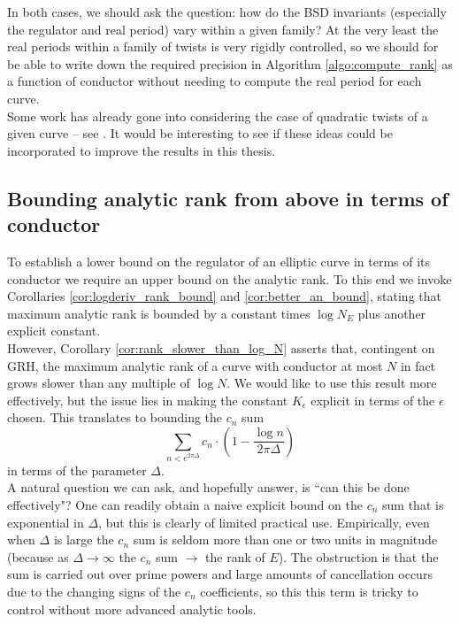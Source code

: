 In both cases, we should ask the question: how do the BSD invariants (especially the regulator and real period) vary within a given family? At the very least the real periods within a family of twists is very rigidly controlled, so we should for be able to write down the required precision in Algorithm \ref{algo:compute_rank} as a function of conductor without needing to compute the real period for each curve. \\

Some work has already gone into considering the case of quadratic twists of a given curve -- see \cite{DeRo-2007}. It would be interesting to see if these ideas could be incorporated to improve the results in this thesis.

\subsection{Bounding analytic rank from above in terms of conductor}

To establish a lower bound on the regulator of an elliptic curve in terms of its conductor we require an upper bound on the analytic rank. To this end we invoke Corollaries \ref{cor:logderiv_rank_bound} and \ref{cor:better_an_bound}, stating that maximum analytic rank is bounded by a constant times $\log N_E$ plus another explicit constant. \\

However, Corollary \ref{cor:rank_slower_than_log_N} asserts that, contingent on GRH, the maximum analytic rank of a curve with conductor at most $N$ in fact grows slower than any multiple of $\log N$. We would like to use this result more effectively, but the issue lies in making the constant $K_\epsilon$ explicit in terms of the $\epsilon$ chosen. This translates to bounding the $c_n$ sum
\begin{equation}
\sum_{n < e^{2\pi \Delta}} c_n \cdot \left(1-\frac{\log n}{2\pi \Delta}\right)
\end{equation}
in terms of the parameter $\Delta$. \\

A natural question we can ask, and hopefully answer, is ``can this be done effectively"? One can readily obtain a naive explicit bound on the $c_n$ sum that is exponential in $\Delta$, but this is clearly of limited practical use. Empirically, even when $\Delta$ is large the $c_n$ sum is seldom more than one or two units in magnitude (because as $\Delta \to \infty$ the $c_n$ sum $\to$ the rank of $E$). The obstruction is that the sum is carried out over prime powers and large amounts of cancellation occurs due to the changing signs of the $c_n$ coefficients, so this this term is tricky to control without more advanced analytic tools.  \\

